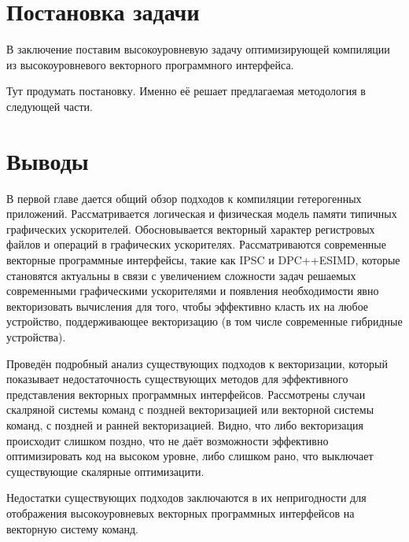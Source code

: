 \section{Постановка задачи}\label{sec:overview/howtobetter}

В заключение поставим высокоуровневую задачу оптимизирующей компиляции из высокоуровневого векторного программного интерфейса.

Тут продумать постановку. Именно её решает предлагаемая методология в следующей части.

\section{Выводы}\label{sec:overview/outcome}

В первой главе дается общий обзор подходов к компиляции гетерогенных приложений. Рассматривается логическая и физическая модель памяти типичных графических ускорителей. Обосновывается векторный характер регистровых файлов и операций в графических ускорителях. Рассматриваются современные векторные программные интерфейсы, такие как IPSC и DPC++ESIMD, которые становятся актуальны в связи с увеличением сложности задач решаемых современными графическими ускорителями и появления необходимости явно векторизовать вычисления для того, чтобы эффективно класть их на любое устройство, поддерживающее векторизацию (в том числе современные гибридные устройства). 

Проведён подробный анализ существующих подходов к векторизации, который показывает недостаточность существующих методов для эффективного представления векторных программных интерфейсов. Рассмотрены случаи скалряной системы команд с поздней векторизацией или векторной системы команд, с поздней и ранней векторизацией. Видно, что либо векторизация происходит слишком поздно, что не даёт возможности эффективно оптимизировать код на высоком уровне, либо слишком рано, что выключает существующие скалярные оптимизацити.

Недостатки существующих подходов заключаются в их непригодности для отображения высокоуровневых векторных программных интерфейсов на векторную систему команд.

\FloatBarrier